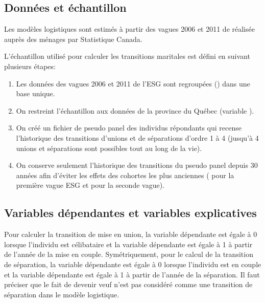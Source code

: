 \documentclass[letterpaper,10pt,french]{sphinxmanual}
\begin{document}
\subsection{Données et échantillon}
\label{\detokenize{transition_models:id6}}
Les modèles logistiques sont estimés à partir des vagues 2006 et 2011 de  réalisée auprès des ménages par Statistique Canada.

L’échantillon utilisé pour calculer les transitions maritales est défini en suivant plusieurs étapes:
\begin{enumerate}
%
\item {} 
Les données des vagues 2006 et 2011 de l’ESG sont regroupées () dans une base unique.

\item {} 
On restreint l’échantillon aux données de la province du Québec (variable ).

\item {} 
On créé un fichier de pseudo panel des individus répondants qui recense l’historique des transitions d’unions et de séparations d’ordre 1 à 4 (jusqu’à 4 unions et séparations sont possibles tout au long de la vie).

\item {} 
On conserve seulement l’historique des transitions du pseudo panel depuis 30 années afin d’éviter les effets des cohortes les plus anciennes ( pour la première vague ESG et  pour la seconde vague).

\end{enumerate}


\subsection{Variables dépendantes et variables explicatives}
\label{\detokenize{transition_models:id8}}
Pour calculer la transition de mise en union, la variable dépendante est égale à 0 lorsque l’individu est célibataire et la variable dépendante est égale à 1 à partir de l’année de la mise en couple. Symétriquement, pour le calcul de la transition de séparation, la variable dépendante est égale à 0 lorsque l’individu est en couple et la variable dépendante est égale à 1 à partir de l’année de la séparation. Il faut préciser que le fait de devenir veuf n’est pas considéré comme une transition de séparation dans le modèle logistique.
\end{document}
